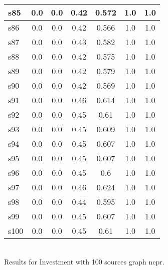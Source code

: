 \documentclass{article}
\begin{document}
\begin{tabular}{|l|c|c|c|c|c|c|}
\hline
s85 &0.0 & 0.0 & 0.42 & 0.572 & 1.0 & 1.0\\
\hline
s86 &0.0 & 0.0 & 0.42 & 0.566 & 1.0 & 1.0\\
\hline
s87 &0.0 & 0.0 & 0.43 & 0.582 & 1.0 & 1.0\\
\hline
s88 &0.0 & 0.0 & 0.42 & 0.575 & 1.0 & 1.0\\
\hline
s89 &0.0 & 0.0 & 0.42 & 0.579 & 1.0 & 1.0\\
\hline
s90 &0.0 & 0.0 & 0.42 & 0.569 & 1.0 & 1.0\\
\hline
s91 &0.0 & 0.0 & 0.46 & 0.614 & 1.0 & 1.0\\
\hline
s92 &0.0 & 0.0 & 0.45 & 0.61 & 1.0 & 1.0\\
\hline
s93 &0.0 & 0.0 & 0.45 & 0.609 & 1.0 & 1.0\\
\hline
s94 &0.0 & 0.0 & 0.45 & 0.607 & 1.0 & 1.0\\
\hline
s95 &0.0 & 0.0 & 0.45 & 0.607 & 1.0 & 1.0\\
\hline
s96 &0.0 & 0.0 & 0.45 & 0.6 & 1.0 & 1.0\\
\hline
s97 &0.0 & 0.0 & 0.46 & 0.624 & 1.0 & 1.0\\
\hline
s98 &0.0 & 0.0 & 0.44 & 0.595 & 1.0 & 1.0\\
\hline
s99 &0.0 & 0.0 & 0.45 & 0.607 & 1.0 & 1.0\\
\hline
s100 &0.0 & 0.0 & 0.45 & 0.61 & 1.0 & 1.0\\
\hline
\end{tabular}\\

\noindent Results for Investment with 100 sources graph ncpr.
\end{document}
